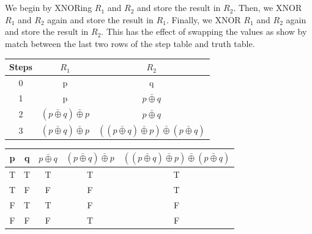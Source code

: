 \documentclass[11pt]{article}
\begin{document}
\section{} %
We begin by XNORing $R_1$ and $R_2$ and store the result in $R_2$. Then, we XNOR $R_1$ and $R_2$ again and store the result in $R_1$. Finally, we XNOR $R_1$ and $R_2$ again and store the result in $R_2$. This has the effect of swapping the values as show by match between the last two rows of the step table and truth table. 
\begin{center}
\begin{tabular}{ c|c|c } 
	Steps & $R_1$ & $R_2$ \\
	\hline
	0 & p & q \\
	1 & p & $p \bar{\oplus} q$ \\
	2 & $(p \bar{\oplus} q) \bar{\oplus} p$ & $p \bar{\oplus} q$ \\
	3 & $(p \bar{\oplus} q) \bar{\oplus} p$ & $((p \bar{\oplus} q) \bar{\oplus} p) \bar{\oplus} (\bar{p \oplus q})$ \\
\end{tabular}
\end{center}
\begin{center}
\begin{tabular}{ c|c|c|c|c } 
	p & q & $p \bar{\oplus} q$ & $(p \bar{\oplus} q) \bar{\oplus} p$ & $((p \bar{\oplus} q) \bar{\oplus} p) \bar{\oplus} (\bar{p \oplus q})$ \\
	\hline
	T & T & T & T & T \\
	T & F & F & F & T \\
	F & T & T & F & F \\
	F & F & F & T & F \\
\end{tabular}
\end{center}
\end{document}
